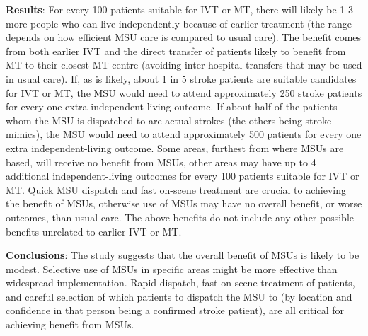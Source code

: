 \textbf{Results}: For every 100 patients suitable for IVT or MT, there will likely be 1-3 more people who can live independently because of earlier treatment (the range depends on how efficient MSU care is compared to usual care). The benefit comes from both earlier IVT and the direct transfer of patients likely to benefit from MT to their closest MT-centre (avoiding inter-hospital transfers that may be used in usual care). If, as is likely, about 1 in 5 stroke patients are suitable candidates for IVT or MT, the MSU would need to attend approximately 250 stroke patients for every one extra independent-living outcome. If about half of the patients whom the MSU is dispatched to are actual strokes (the others being stroke mimics), the MSU would need to attend approximately 500 patients for every one extra independent-living outcome. Some areas, furthest from where MSUs are based, will receive no benefit from MSUs, other areas may have up to 4 additional independent-living outcomes for every 100 patients suitable for IVT or MT. Quick MSU dispatch and fast on-scene treatment are crucial to achieving the benefit of MSUs, otherwise use of MSUs may have no overall benefit, or worse outcomes, than usual care. The above benefits do not include any other possible benefits unrelated to earlier IVT or MT.

\textbf{Conclusions}: The study suggests that the overall benefit of MSUs is likely to be modest. Selective use of MSUs in specific areas might be more effective than widespread implementation. Rapid dispatch, fast on-scene treatment of patients, and careful selection of which patients to dispatch the MSU to (by location and confidence in that person being a confirmed stroke patient), are all critical for achieving benefit from MSUs.
